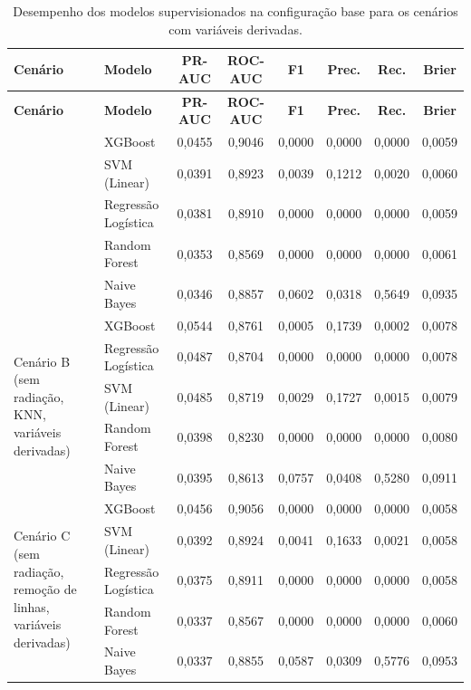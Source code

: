 \begin{longtable}{p{3.4cm} l c c c c c c}
\caption{Desempenho dos modelos supervisionados na configuração base para os cenários com variáveis derivadas.}
\label{tab:resultados_base_calculadas_sem_tratamento} \\
\toprule
\textbf{Cenário} & \textbf{Modelo} & \textbf{PR-AUC} & \textbf{ROC-AUC} & \textbf{F1} & \textbf{Prec.} & \textbf{Rec.} & \textbf{Brier} \\
\midrule
\endfirsthead

\toprule
\textbf{Cenário} & \textbf{Modelo} & \textbf{PR-AUC} & \textbf{ROC-AUC} & \textbf{F1} & \textbf{Prec.} & \textbf{Rec.} & \textbf{Brier} \\
\midrule
\endhead

\bottomrule
\endfoot

\bottomrule
\endlastfoot

\multirow{5}{*}{\parbox{3.4cm}{\centering Cenário A\\(sem radiação, variáveis derivadas)}} 
   & XGBoost             & 0,0455 & 0,9046 & 0,0000 & 0,0000 & 0,0000 & 0,0059 \\
   & SVM (Linear)        & 0,0391 & 0,8923 & 0,0039 & 0,1212 & 0,0020 & 0,0060 \\
   & Regressão Logística & 0,0381 & 0,8910 & 0,0000 & 0,0000 & 0,0000 & 0,0059 \\
   & Random Forest       & 0,0353 & 0,8569 & 0,0000 & 0,0000 & 0,0000 & 0,0061 \\
   & Naive Bayes         & 0,0346 & 0,8857 & 0,0602 & 0,0318 & 0,5649 & 0,0935 \\
\midrule

\multirow{5}{*}{\parbox{3.4cm}{\centering Cenário B\\(sem radiação, KNN, variáveis derivadas)}} 
   & XGBoost             & 0,0544 & 0,8761 & 0,0005 & 0,1739 & 0,0002 & 0,0078 \\
   & Regressão Logística & 0,0487 & 0,8704 & 0,0000 & 0,0000 & 0,0000 & 0,0078 \\
   & SVM (Linear)        & 0,0485 & 0,8719 & 0,0029 & 0,1727 & 0,0015 & 0,0079 \\
   & Random Forest       & 0,0398 & 0,8230 & 0,0000 & 0,0000 & 0,0000 & 0,0080 \\
   & Naive Bayes         & 0,0395 & 0,8613 & 0,0757 & 0,0408 & 0,5280 & 0,0911 \\
\midrule

\multirow{5}{*}{\parbox{3.4cm}{\centering Cenário C\\(sem radiação, remoção de linhas, variáveis derivadas)}} 
   & XGBoost             & 0,0456 & 0,9056 & 0,0000 & 0,0000 & 0,0000 & 0,0058 \\
   & SVM (Linear)        & 0,0392 & 0,8924 & 0,0041 & 0,1633 & 0,0021 & 0,0058 \\
   & Regressão Logística & 0,0375 & 0,8911 & 0,0000 & 0,0000 & 0,0000 & 0,0058 \\
   & Random Forest       & 0,0337 & 0,8567 & 0,0000 & 0,0000 & 0,0000 & 0,0060 \\
   & Naive Bayes         & 0,0337 & 0,8855 & 0,0587 & 0,0309 & 0,5776 & 0,0953 \\
\midrule


\end{longtable}
